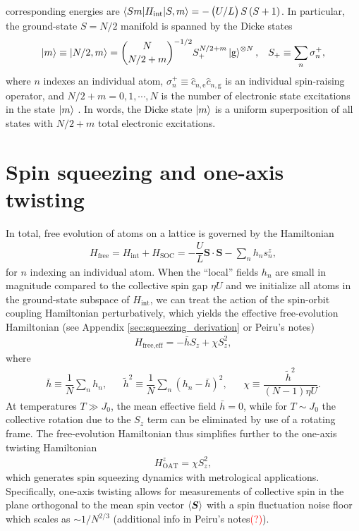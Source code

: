 \documentclass[aps,notitlepage,nofootinbib,11pt]{revtex4-1}
\renewcommand{\t}{\text} %
\newcommand{\f}[2]{\dfrac{#1}{#2}} %
\newcommand{\p}[1]{\left(#1\right)} %
\renewcommand{\v}{\bm} %
\renewcommand{\c}{\cdot} %
\newcommand{\bk}{\braket} %
\newcommand{\g}{\text{g}} %
\newcommand{\e}{\text{e}}
\newcommand{\1}{\mathds{1}}
\newcommand{\note}[1]{\textcolor{red}{#1}}
\begin{document}
corresponding energies are $\bk{Sm|H_{\t{int}}|S,m}=-\p{U/L}S\p{S+1}$.
In particular, the ground-state $S=N/2$ manifold is spanned by the
Dicke states
\begin{align}
  \ket{m} \equiv \ket{N/2,m}
  = {N \choose N/2+m}^{-1/2} S_+^{N/2+m} \ket{\g}^{\otimes N},
  &&
  S_+ \equiv \sum_n \sigma_n^+,
  \label{eq:dicke_states}
\end{align}
where $n$ indexes an individual atom,
$\sigma_n^+\equiv\hat c_{n,\e}\hat c_{n,\g}$ is an individual
spin-raising operator, and $N/2+m=0,1,\cdots,N$ is the number of
electronic state excitations in the state $\ket{m}$
\cite{swallows2011suppression}.  In words, the Dicke state $\ket{m}$
is a uniform superposition of all states with $N/2+m$ total electronic
excitations.


\section{Spin squeezing and one-axis twisting}
\label{sec:OAT}

In total, free evolution of atoms on a lattice is governed by the
Hamiltonian
\begin{align}
  H_{\t{free}}
  = H_{\t{int}} + H_{\t{SOC}}
  = -\f{U}{L} \v S\c\v S - \sum_n h_n s_n^z,
\end{align}
for $n$ indexing an individual atom.  When the ``local'' fields $h_n$
are small in magnitude compared to the collective spin gap $\eta U$
and we initialize all atoms in the ground-state subspace of
$H_{\t{int}}$, we can treat the action of the spin-orbit coupling
Hamiltonian perturbatively, which yields the effective free-evolution
Hamiltonian (see Appendix \ref{sec:squeezing_derivation} or Peiru's
notes)
\begin{align}
  H_{\t{free,eff}} = -\bar h S_z + \chi S_z^2,
\end{align}
where
\begin{align}
  \bar h \equiv \f1N \sum_n h_n,
  &&
  \tilde h^2 \equiv \f1N \sum_n \p{h_n - \bar h}^2,
  &&
  \chi \equiv \f{\tilde h^2}{\p{N-1}\eta U}.
\end{align}
At temperatures $T\gg J_0$, the mean effective field $\bar h=0$, while
for $T\sim J_0$ the collective rotation due to the $S_z$ term can be
eliminated by use of a rotating frame.  The free-evolution Hamiltonian
thus simplifies further to the one-axis twisting Hamiltonian
\begin{align}
  H_{\t{OAT}}^z = \chi S_z^2,
  \label{eq:H_OAT}
\end{align}
which generates spin squeezing dynamics with metrological
applications.  Specifically, one-axis twisting allows for measurements
of collective spin in the plane orthogonal to the mean spin vector
$\bk{\v S}$ with a spin fluctuation noise floor which scales as
$\sim1/N^{2/3}$ (additional info in Peiru's notes\note{(?)}).
\end{document}

